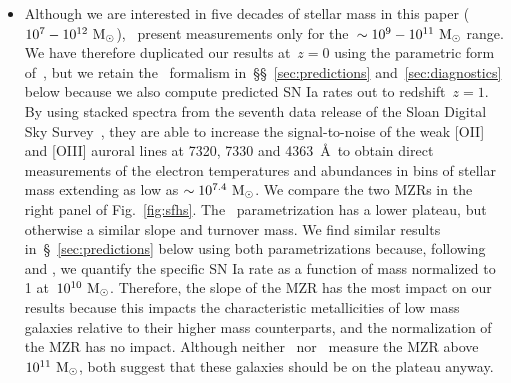 \documentclass[ms.tex]{subfiles}
\begin{document}
\begin{itemize}
	\item Although we are interested in five decades of stellar mass in this
	paper ($10^7 - 10^{12}~\text{M}_\odot$),~\citet{Zahid2014} present measurements only
	for the~$\sim10^9 - 10^{11}~\text{M}_\odot$ range.
	We have therefore duplicated our results at~$z = 0$ using the parametric
	form of~\citet{Andrews2013}, but we retain the~\citet{Zahid2014} formalism
	in~\S\S~\ref{sec:predictions} and~\ref{sec:diagnostics} below because we
	also compute predicted SN Ia rates out to redshift~$z = 1$.
	By using stacked spectra from the seventh data release of the Sloan Digital
	Sky Survey~\citep{Abazajian2009}, they are able to increase the
	signal-to-noise of the weak [OII] and [OIII] auroral lines at 7320, 7330
	and 4363~\AA~to obtain direct measurements of the electron temperatures
	and abundances in bins of stellar mass extending as low as
	$\sim10^{7.4}~\text{M}_\odot$.
	We compare the two MZRs in the right panel of Fig.~\ref{fig:sfhs}.
	The~\citet{Andrews2013} parametrization has a lower plateau, but otherwise
	a similar slope and turnover mass.
	We find similar results in~\S~\ref{sec:predictions} below using both
	parametrizations because, following~\citet{Brown2019} and
	\citet{Gandhi2022}, we quantify the specific SN Ia rate as a function of
	mass normalized to 1 at~$10^{10}~\text{M}_\odot$.
	Therefore, the slope of the MZR has the most impact on our results because
	this impacts the characteristic metallicities of low mass galaxies relative
	to their higher mass counterparts, and the normalization of the MZR has no
	impact.
	Although neither~\citet{Andrews2013} nor~\citet{Zahid2014} measure the MZR
	above~$10^{11}~\text{M}_\odot$, both suggest that these galaxies should be on the
	plateau anyway.

\end{itemize}

\end{document}
